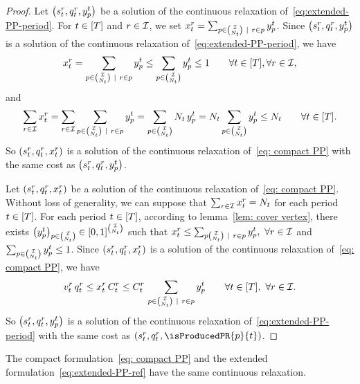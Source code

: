 \begin{proof}
Let $\bracket{\inventory_t^r, \quantity_t^r, y_p^t}$ be a solution of the continuous relaxation of~\eqref{eq:extended-PP-period}.
For $t\in\range{\horizon}$ and $r\in\mathcal{I}$, we set $x_t^r=\sum_{p\in{\mathcal{I}\choose N_t}~|~r\in p} y_p^t$.
Since $\bracket{\inventory_t^r, \quantity_t^r, y_p^t}$ is a solution of the continuous relaxation of~\eqref{eq:extended-PP-period}, we have
$$
\setup_t^r
= \sum_{p\in{\REF\choose\nbsetups_t}~|~r\in p} y_p^t
\le \sum_{p\in{\REF\choose\nbsetups_t}} y_p^t
\le 1
\qquad \forall t\in\range{\horizon},\forall r\in\REF,
$$
and
$$
\sum_{r\in\REF}\setup_t^r
= \sum_{r\in\REF}\sum_{p\in{\REF\choose\nbsetups_t}~|~r\in p} y_p^t
= \sum_{p\in{\REF\choose\nbsetups_t}} \nbsetups_t\, y_p^t
= \nbsetups_t \sum_{p\in{\REF\choose\nbsetups_t}} y_p^t
\le \nbsetups_t
\qquad \forall t\in\range{\horizon}.
$$
So $\bracket{\inventory_t^r, \quantity_t^r, \setup_t^r}$  is a solution of the continuous relaxation of~\eqref{eq: compact PP} with the same cost as $\bracket{\inventory_t^r, \quantity_t^r, y_p^t}$.


Let $\bracket{\inventory_t^r, \quantity_t^r, \setup_t^r}$ be a solution of the continuous relaxation of~\eqref{eq: compact PP}. Without loss of generality, we can suppose that $\sum_{r\in\mathcal{I}}x_t^r=N_t$ for each period $t\in\range{\horizon}$.
For each period $t\in\range{\horizon}$, according to lemma~\ref{lem: cover vertex}, there exists
$\bracket{y_p^t}_{p\in{\REF\choose\nbsetups_t}}\in\sqbracket{0,1}^{\REF\choose\nbsetups_t}$ such that
$x_t^r \le \sum_{p{\mathcal{I}\choose N_t}~|~r\in p} y_p^t,\ \forall r\in\mathcal{I}$ and
$\sum_{p\in{\mathcal{I}\choose N_t}}y_p^t \le 1$.
Since $\bracket{\inventory_t^r, \quantity_t^r, \setup_t^r}$ is a solution of the continuous relaxation of~\eqref{eq: compact PP}, we have
$$
\rate_t^r\, \quantity_t^r
\le \setup_t^r\, \capacity_t^r
\le \capacity_t^r\, \sum_{p\in{\REF\choose\nbsetups_t}~|~r\in p} y_p^t
\qquad \forall t\in\range{\horizon},\ \forall r\in\REF.
$$
So $\bracket{\inventory_t^r, \quantity_t^r, y_p^t}$ is a solution of the continuous relaxation of~\eqref{eq:extended-PP-period} with the same cost as $\bracket{\inventory_t^r, \quantity_t^r, \isProducedPR{p}{t}}$.
\end{proof}



\begin{prop}\label{prop: equality relaxation 2}
The compact formulation~\eqref{eq: compact PP} and the extended formulation~\eqref{eq:extended-PP-ref} have the same continuous relaxation.
\end{prop}


